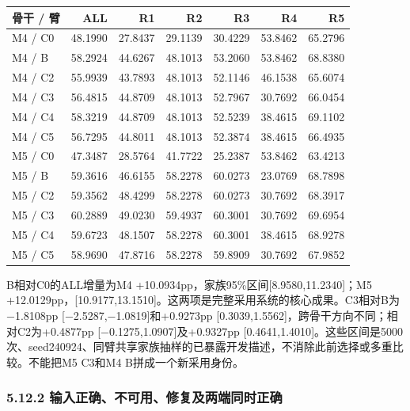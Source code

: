 \documentclass[
  11pt,
  a4paper,
]{article}
\newcounter{none} %
\begin{document}
{\def\LTcaptype{none} %
\begin{longtable}[]{@{}lrrrrrr@{}}
\toprule\noalign{}
骨干 / 臂 & ALL & R1 & R2 & R3 & R4 & R5 \\
\midrule\noalign{}
\endhead
\bottomrule\noalign{}
\endlastfoot
M4 / C0 & 48.1990 & 27.8437 & 29.1139 & 30.4229 & 53.8462 & 65.2796 \\
M4 / B & 58.2924 & 44.6267 & 48.1013 & 53.2060 & 53.8462 & 68.8380 \\
M4 / C2 & 55.9939 & 43.7893 & 48.1013 & 52.1146 & 46.1538 & 65.6074 \\
M4 / C3 & 56.4815 & 44.8709 & 48.1013 & 52.7967 & 30.7692 & 66.0454 \\
M4 / C4 & 58.3219 & 44.8709 & 48.1013 & 52.5239 & 38.4615 & 69.1102 \\
M4 / C5 & 56.7295 & 44.8011 & 48.1013 & 52.3874 & 38.4615 & 66.4935 \\
M5 / C0 & 47.3487 & 28.5764 & 41.7722 & 25.2387 & 53.8462 & 63.4213 \\
M5 / B & 59.3616 & 46.6155 & 58.2278 & 60.0273 & 23.0769 & 68.7898 \\
M5 / C2 & 59.3562 & 48.4299 & 58.2278 & 60.0273 & 30.7692 & 68.3917 \\
M5 / C3 & 60.2889 & 49.0230 & 59.4937 & 60.3001 & 30.7692 & 69.6954 \\
M5 / C4 & 59.6723 & 48.1507 & 58.2278 & 60.3001 & 38.4615 & 68.9278 \\
M5 / C5 & 58.9690 & 47.8716 & 58.2278 & 59.8909 & 30.7692 & 67.9852 \\
\end{longtable}
}

B相对C0的ALL增量为M4 +10.0934pp，家族95\%区间{[}8.9580,11.2340{]}；M5
+12.0129pp，{[}10.9177,13.1510{]}。这两项是完整采用系统的核心成果。C3相对B为−1.8108pp
{[}−2.5287,−1.0819{]}和+0.9273pp
{[}0.3039,1.5562{]}，跨骨干方向不同；相对C2为+0.4877pp
{[}−0.1275,1.0907{]}及+0.9327pp
{[}0.4641,1.4010{]}。这些区间是5000次、seed240924、同臂共享家族抽样的已暴露开发描述，不消除此前选择或多重比较。不能把M5
C3和M4 B拼成一个新采用身份。

\subsubsection{5.12.2
输入正确、不可用、修复及两端同时正确}\label{ux8f93ux5165ux6b63ux786eux4e0dux53efux7528ux4feeux590dux53caux4e24ux7aefux540cux65f6ux6b63ux786e}
\end{document}
